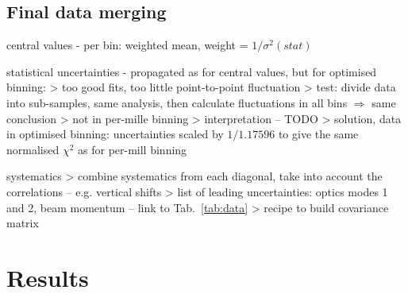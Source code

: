 \subsection{Final data merging}

\> central values - per bin: weighted mean, weight = $1/\sigma^2(stat)$

\> statistical uncertainties - propagated as for central values, but for optimised binning:
\>> too good fits, too little point-to-point fluctuation
\>> test: divide data into sub-samples, same analysis, then calculate fluctuations in all bins $\Rightarrow$ same conclusion
\>> not in per-mille binning
\>> interpretation -- TODO
\>> solution, data in optimised binning: uncertainties scaled by $1/1.17596$ to give the same normalised $\chi^2$ as for per-mill binning

\> systematics
\>> combine systematics from each diagonal, take into account the correlations -- e.g. vertical shifts
\>> list of leading uncertainties: optics modes 1 and 2, beam momentum -- link to Tab.~\ref{tab:data}
\>> recipe to build covariance matrix

\section{Results}


